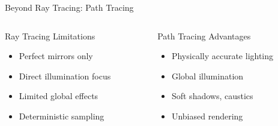 \begin{frame}{Beyond Ray Tracing: Path Tracing}
    \begin{columns}
        \begin{column}{0.5\textwidth}
            \begin{raybox}{Ray Tracing Limitations}
                \begin{itemize}
                    \item Perfect mirrors only
                    \item Direct illumination focus
                    \item Limited global effects
                    \item Deterministic sampling
                \end{itemize}
            \end{raybox}
        \end{column}
        \begin{column}{0.5\textwidth}
            \begin{raybox}{Path Tracing Advantages}
                \begin{itemize}
                    \item Physically accurate lighting
                    \item Global illumination
                    \item Soft shadows, caustics
                    \item Unbiased rendering
                \end{itemize}
            \end{raybox}
        \end{column}
    \end{columns}
\end{frame}

